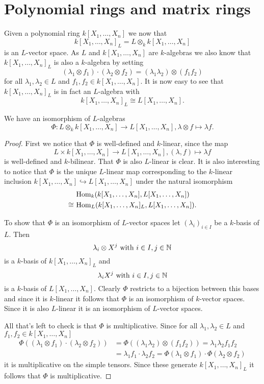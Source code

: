 \section{Polynomial rings and matrix rings}
Given a polynomial ring $k[X_1, \dotsc, X_n]$ we now that
\[
 k[X_1, \dotsc, X_n]_L = L \otimes_k k[X_1, \dotsc, X_n]
\]
is an $L$-vector space. As $L$ and $k[X_1, \dotsc, X_n]$ are $k$-algebras we also know that $k[X_1, \dotsc, X_n]_L$ is also a $k$-algebra by setting
\[
 (\lambda_1 \otimes f_1) \cdot (\lambda_2 \otimes f_2) = (\lambda_1 \lambda_2) \otimes (f_1 f_2)
\]
for all $\lambda_1, \lambda_2 \in L$ and $f_1, f_2 \in k[X_1, \dotsc, X_n]$. It is now easy to see that $k[X_1, \dotsc, X_n]_L$ is in fact an $L$-algebra with
\[
 k[X_1, \dotsc, X_n]_L \cong L[X_1, \dotsc, X_n].
\]


\begin{prop}
 We have an isomorphism of $L$-algebras
 \[
  \Phi \colon L \otimes_k k[X_1, \dotsc, X_n] \to L[X_1, \dotsc, X_n], \lambda \otimes f \mapsto \lambda f.
 \]
\end{prop}
\begin{proof}
 First we notice that $\Phi$ is well-defined and $k$-linear, since the map
 \[
  L \times k[X_1, \dotsc, X_n] \to L[X_1, \dotsc, X_n], (\lambda,f) \mapsto \lambda f
 \]
 is well-defined and $k$-bilinear. That $\Phi$ is also $L$-linear is clear. It is also interesting to notice that $\Phi$ is the unique $L$-linear map corresponding to the $k$-linear inclusion $k[X_1, \dotsc, X_n] \hookrightarrow L[X_1, \dotsc, X_n]$ under the natural isomorphism
 \begin{align*}
       &\, \operatorname{Hom}_k(k[X_1, \dotsc, X_n], L[X_1, \dotsc, X_n]) \\
  \cong&\, \operatorname{Hom}_L(k[X_1, \dotsc, X_n]_L, L[X_1, \dotsc, X_n]).
 \end{align*}
 
 To show that $\Phi$ is an isomorphism of $L$-vector spaces let $(\lambda_i)_{i \in I}$ be a $k$-basis of $L$. Then
 \[
  \lambda_i \otimes X^j \text{ with } i \in I, j \in \mathbb{N}
 \]
 is a $k$-basis of $k[X_1, \dotsc, X_n]_L$ and
 \[
  \lambda_i X^j \text{ with } i \in I, j \in \mathbb{N}
 \]
 is a $k$-basis of $L[X_1, \dotsc, X_n]$. Clearly $\Phi$ restricts to a bijection between this bases and since it is $k$-linear it follows that $\Phi$ is an isomorphism of $k$-vector spaces. Since it is also $L$-linear it is an isomorphism of $L$-vector spaces.
 
 All that’s left to check is that $\Phi$ is multiplicative. Since for all $\lambda_1, \lambda_2 \in L$ and $f_1, f_2 \in k[X_1, \dotsc, X_n]$
 \begin{align*}
  \Phi((\lambda_1 \otimes f_1) \cdot (\lambda_2 \otimes f_2))
  &= \Phi((\lambda_1 \lambda_2) \otimes (f_1 f_2))
   = \lambda_1 \lambda_2 f_1 f_2 \\
  &= \lambda_1 f_1 \cdot \lambda_2 f_2
   = \Phi(\lambda_1 \otimes f_1) \cdot \Phi(\lambda_2 \otimes f_2)
 \end{align*}
 it is multiplicative on the simple tensors. Since these generate $k[X_1, \dotsc, X_n]_L$ it follows that $\Phi$ is multiplicative.
\end{proof}


